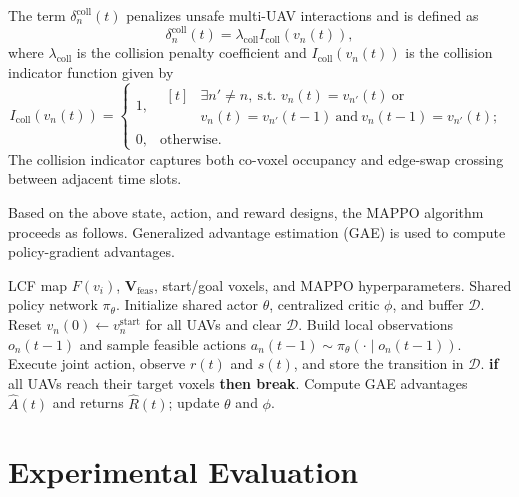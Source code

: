 \documentclass[10pt,journal,letterpaper]{IEEEtran}
\begin{document}
The term $\delta_n^{\mathrm{coll}}(t)$ penalizes unsafe multi-UAV interactions and is defined as
\begin{equation}
\delta_n^{\mathrm{coll}}(t)=\lambda_{\mathrm{coll}}I_{\mathrm{coll}}(v_n(t)),
\end{equation}
where $\lambda_{\mathrm{coll}}$ is the collision penalty coefficient and $I_{\mathrm{coll}}(v_n(t))$ is the collision indicator function given by
\begin{equation}
I_{\mathrm{coll}}(v_n(t))=
\begin{cases}
1, &\begin{aligned}[t]
&\exists n'\neq n,\ \text{s.t. }v_n(t)=v_{n'}(t)\ \text{or}\\
&v_n(t)=v_{n'}(t-1)\ \text{and}\ v_n(t-1)=v_{n'}(t);
\end{aligned}\\
0, & \mathrm{otherwise}.
\end{cases}
\end{equation}
The collision indicator captures both co-voxel occupancy and edge-swap crossing between adjacent time slots.

Based on the above state, action, and reward designs, the MAPPO algorithm proceeds as follows. Generalized advantage estimation (GAE) is used to compute policy-gradient advantages.

\begin{algorithm}[!t]
\caption{LCF-Aided Multi-UAV Trajectory Planning via MAPPO}
\label{alg:lcf_mappo}
\begin{algorithmic}
\footnotesize
\REQUIRE LCF map $F(v_i)$, $\mathbf{V}_{\mathrm{feas}}$, start/goal voxels, and MAPPO hyperparameters.
\ENSURE Shared policy network $\pi_{\theta}$.
\STATE Initialize shared actor $\theta$, centralized critic $\phi$, and buffer $\mathcal{D}$.
\REPEAT
    \STATE Reset $v_n(0)\leftarrow v_n^{\mathrm{start}}$ for all UAVs and clear $\mathcal{D}$.
        \STATE Build local observations $o_n(t-1)$ and sample feasible actions $a_n(t-1)\sim\pi_{\theta}(\cdot\mid o_n(t-1))$.
        \STATE Execute joint action, observe $r(t)$ and $s(t)$, and store the transition in $\mathcal{D}$.
        \STATE \textbf{if} all UAVs reach their target voxels \textbf{then break}.
    \ENDFOR
    \STATE Compute GAE advantages $\hat{A}(t)$ and returns $\hat{R}(t)$; update $\theta$ and $\phi$.
\end{algorithmic}
\end{algorithm}

\section{Experimental Evaluation}
\end{document}
